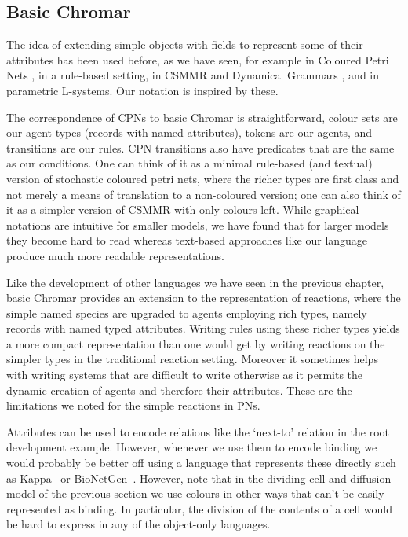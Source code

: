 \subsection{Basic Chromar}
The idea of extending simple objects with fields to represent some of their
attributes has been used before, as we have seen, for example in Coloured Petri
Nets \citep{jensen_coloured_1987}, in a rule-based setting, in CSMMR
\citep{oury_coloured_2011} and Dynamical Grammars \citep{mjolsness2006stochastic},
and in parametric L-systems. Our notation is inspired by these.

The correspondence of CPNs to basic Chromar is straightforward, colour sets are
our agent types (records with named attributes), tokens are our agents, and
transitions are our rules. CPN transitions also have predicates that are the
same as our conditions. One can think of it as a minimal rule-based (and
textual) version of stochastic coloured petri nets, where the richer types are
first class and not merely a means of translation to a non-coloured version; one
can also think of it as a simpler version of CSMMR with only colours left. While
graphical notations are intuitive for smaller models, we have found that for
larger models they become hard to read whereas text-based approaches like our
language produce much more readable representations.

Like the development of other languages we have seen in the previous chapter,
basic Chromar provides an extension to the representation of reactions, where
the simple named species are upgraded to agents employing rich types, namely
records with named typed attributes. Writing rules using these richer types
yields a more compact representation than one would get by writing reactions on
the simpler types in the traditional reaction setting. Moreover it sometimes
helps with writing systems that are difficult to write otherwise as it permits
the dynamic creation of agents and therefore their attributes. These are the
limitations we noted for the simple reactions in PNs.

Attributes can be used to encode relations like the `next-to' relation in the
root development example.  However, whenever we use them to encode binding we
would probably be better off using a language that represents these directly
such as Kappa~\cite{danos2008} or BioNetGen~\cite{blinov2004bionetgen}.
However, note that in the dividing cell and diffusion model of the previous
section we use colours in other ways that can't be easily represented as
binding.  In particular, the division of the contents of a cell would be hard to
express in any of the object-only languages.


